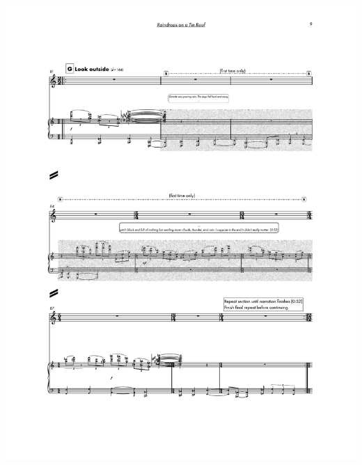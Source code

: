 \begin{center}
     \includegraphics[scale=0.75]{Scores/raindrops_Part15.pdf}
\end{center}
\newpage
